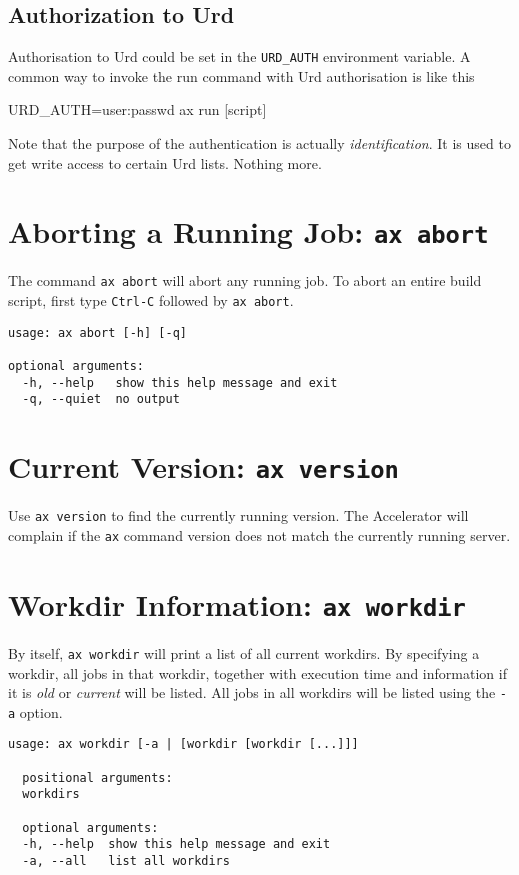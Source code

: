 \subsection{Authorization to Urd}
Authorisation to Urd could be set in the \texttt{URD\_AUTH}
environment variable.  A common way to invoke the run command with Urd
authorisation is like this
\begin{shell}
URD_AUTH=user:passwd ax run [script]
\end{shell}
Note that the purpose of the authentication is
actually \textsl{identification}.  It is used to get write access to
certain Urd lists.  Nothing more.


\section{Aborting a Running Job: \texttt{ax abort}}
The command \texttt{ax abort} will abort any running job.  To abort an
entire build script, first type \texttt{Ctrl-C} followed by \texttt{ax
  abort}.
\begin{snugshade}
\begin{verbatim}
usage: ax abort [-h] [-q]

optional arguments:
  -h, --help   show this help message and exit
  -q, --quiet  no output
\end{verbatim}
\end{snugshade}


\section{Current Version: \texttt{ax version}}
Use \texttt{ax version} to find the currently running version.  The
Accelerator will complain if the \texttt{ax} command version does not
match the currently running server.


\section{Workdir Information: \texttt{ax workdir}}
By itself, \texttt{ax workdir} will print a list of all current
workdirs.  By specifying a workdir, all jobs in that workdir, together
with execution time and information if it is \textsl{old} or
\textsl{current} will be listed.  All jobs in all workdirs will be
listed using the \texttt{-a} option.
\begin{snugshade}
\begin{verbatim}
usage: ax workdir [-a | [workdir [workdir [...]]]

  positional arguments:
  workdirs

  optional arguments:
  -h, --help  show this help message and exit
  -a, --all   list all workdirs
\end{verbatim}
\end{snugshade}


